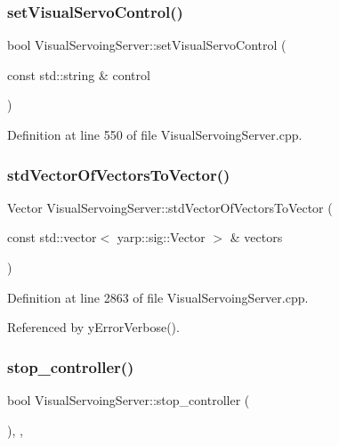 \subsubsection{\texorpdfstring{set\+Visual\+Servo\+Control()}{setVisualServoControl()}}
{\footnotesize\ttfamily bool Visual\+Servoing\+Server\+::set\+Visual\+Servo\+Control (\begin{DoxyParamCaption}\item[{const std\+::string \&}]{control }\end{DoxyParamCaption})\hspace{0.3cm}{\ttfamily [override]}}



Definition at line 550 of file Visual\+Servoing\+Server.\+cpp.

\mbox{\label{classVisualServoingServer_adcc6db0a6cf857c4bd44d495ec445954}} 
\subsubsection{\texorpdfstring{std\+Vector\+Of\+Vectors\+To\+Vector()}{stdVectorOfVectorsToVector()}}
{\footnotesize\ttfamily Vector Visual\+Servoing\+Server\+::std\+Vector\+Of\+Vectors\+To\+Vector (\begin{DoxyParamCaption}\item[{const std\+::vector$<$ yarp\+::sig\+::\+Vector $>$ \&}]{vectors }\end{DoxyParamCaption})\hspace{0.3cm}{\ttfamily [private]}}



Definition at line 2863 of file Visual\+Servoing\+Server.\+cpp.



Referenced by y\+Error\+Verbose().

\mbox{\label{classVisualServoingServer_ac8d5b33c4ae61707e121c5154a973ab8}} 
\subsubsection{\texorpdfstring{stop\+\_\+controller()}{stop\_controller()}}
{\footnotesize\ttfamily bool Visual\+Servoing\+Server\+::stop\+\_\+controller (\begin{DoxyParamCaption}{ }\end{DoxyParamCaption})\hspace{0.3cm}{\ttfamily [override]}, {\ttfamily [protected]}, {\ttfamily [virtual]}}



